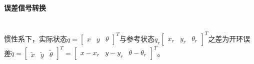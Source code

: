 \documentclass[
12pt, %
a4paper, 
oneside, %
headinclude,footinclude, %
]{scrartcl}
\begin{document}
\paragraph{误差信号转换}~\\

惯性系下，实际状态$ q = \begin{bmatrix} x & y & \theta \end{bmatrix}^T $与参考状态$ q_r \begin{bmatrix} x_r & y_r & \theta_r \end{bmatrix}^T $之差为开环误差$ \tilde{q} = \begin{bmatrix} \tilde{x} & \tilde{y} & \tilde{\theta} \end{bmatrix}^T = \begin{bmatrix} x - x_r & y - y_r & \theta - \theta_r \end{bmatrix}^T $。
\end{document}
